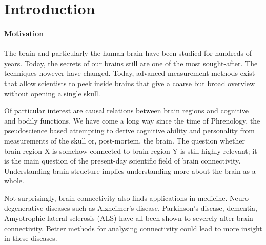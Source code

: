 \documentclass[a4paper, 10pt, english, twocolumn]{article}
\title{\fontfamily{phv}\selectfont{Causal Discovery methods for Effective Connectivity}}
\author{
  \textbf{Ramon Janssen} - \href{mailto:ramon.janssen@student.ru.nl}{ramon.janssen@student.ru.nl} \\
  \textbf{Tom de Ruijter} - \href{mailto:t.deruijter@student.ru.nl}{t.deruijter@student.ru.nl}
}
\date{\fontfamily{ptm}\selectfont{\small{\bfseries{\today - Radboud
Universiteit Nijmegen}}}\\[0.5cm]\rule{\linewidth}{0.3mm}}
\newcommand{\keywords}[1]{\par\noindent 
{\bf Keywords\/}. #1}
\begin{document}
\maketitle

\begin{abstract}
Lorem Ipsum Dolor Sit Amet.
\keywords{Keywords}
\end{abstract}

\setlength{\parindent}{0.0cm}
\setlength{\parskip}{0.25cm}

\section{Introduction}


\paragraph{Motivation}
The brain and particularly the human brain have been studied for hundreds of years.
Today, the secrets of our brains still are one of the most sought-after.
The techniques however have changed.
Today, advanced measurement methods exist that allow scientists to peek inside brains that give a coarse but broad overview without opening a single skull.

Of particular interest are causal relations between brain regions and cognitive and bodily functions.
We have come a long way since the time of Phrenology, the pseudoscience based attempting to derive cognitive ability and personality from measurements of the skull or, post-mortem, the brain.
The question whether brain region X is somehow connected to brain region Y is still highly relevant; it is the main question of the present-day scientific field of brain connectivity.
Understanding brain structure implies understanding more about the brain as a whole.

Not surprisingly, brain connectivity also finds applications in medicine.
Neuro-degenerative diseases such as Alzheimer's disease, Parkinson's disease, dementia, Amyotrophic lateral sclerosis (ALS) have all been shown to severely alter brain connectivity. %
Better methods for analysing connectivity could lead to more insight in these diseases.
\end{document}
